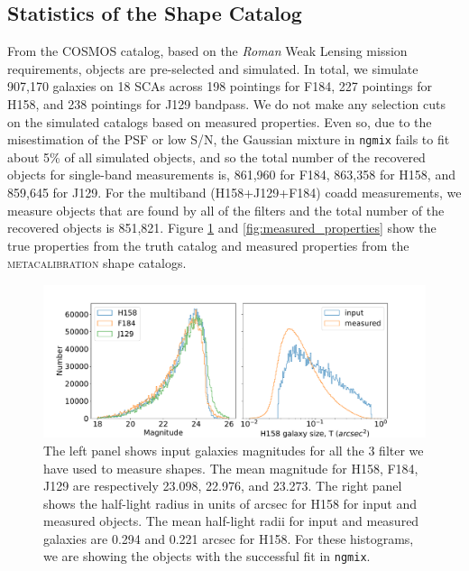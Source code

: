 \documentclass[fleqn,usenatbib]{mnras}
\begin{document}
\subsection{Statistics of the Shape Catalog}
From the COSMOS catalog, based on the \emph{Roman} Weak Lensing mission requirements, objects are pre-selected and simulated. In total, we simulate 907,170 galaxies on 18 SCAs across 198 pointings for F184, 227 pointings for H158, and 238 pointings for J129 bandpass. We do not make any selection cuts on the simulated catalogs based on measured properties. Even so, due to the misestimation of the PSF or low S/N, the Gaussian mixture in \texttt{ngmix} fails to fit about 5\% of all simulated objects, and so the total number of the recovered objects for single-band measurements is, 861,960 for F184, 863,358 for H158, and 859,645 for J129. For the multiband (H158+J129+F184) coadd measurements, we measure objects that are found by all of the filters and the total number of the recovered objects is 851,821.
Figure \ref{fig:true_properties} and \ref{fig:measured_properties} show the true properties from the truth catalog and measured properties from the \textsc{metacalibration} shape catalogs. 

\begin{figure}
    \hspace*{-1.5cm}
	\includegraphics[scale=0.3]{true_properties.pdf}
	\centering
    \caption{The left panel shows input galaxies magnitudes for all the 3 filter we have used to measure shapes. The mean magnitude for H158, F184, J129 are respectively 23.098, 22.976, and 23.273. The right panel shows the half-light radius in units of arcsec for H158 for input and measured objects. The mean half-light radii for input and measured galaxies are 0.294 and 0.221 arcsec for H158. For these histograms, we are showing the objects with the successful fit in \texttt{ngmix}.}
    \label{fig:true_properties}
\end{figure}
\end{document}
